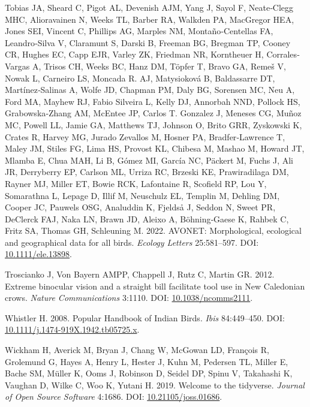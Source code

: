\documentclass[10pt,a4paper]{article}
\newlength{\cslhangindent}
\newenvironment{CSLReferences}[2] %
 {\begin{list}{}{%
  \setlength{\itemindent}{0pt}
  \setlength{\leftmargin}{0pt}
  \setlength{\parsep}{0pt}
  \ifodd #1
   \setlength{\leftmargin}{\cslhangindent}
   \setlength{\itemindent}{-1\cslhangindent}
  \fi
  \setlength{\itemsep}{#2\baselineskip}}}
 {\end{list}}
\begin{document}
\begin{CSLReferences}{1}{0}
Tobias JA, Sheard C, Pigot AL, Devenish AJM, Yang J, Sayol F, Neate‐Clegg MHC, Alioravainen N, Weeks TL, Barber RA, Walkden PA, MacGregor HEA, Jones SEI, Vincent C, Phillips AG, Marples NM, Montaño‐Centellas FA, Leandro‐Silva V, Claramunt S, Darski B, Freeman BG, Bregman TP, Cooney CR, Hughes EC, Capp EJR, Varley ZK, Friedman NR, Korntheuer H, Corrales‐Vargas A, Trisos CH, Weeks BC, Hanz DM, Töpfer T, Bravo GA, Remeš V, Nowak L, Carneiro LS, Moncada R. AJ, Matysioková B, Baldassarre DT, Martínez‐Salinas A, Wolfe JD, Chapman PM, Daly BG, Sorensen MC, Neu A, Ford MA, Mayhew RJ, Fabio Silveira L, Kelly DJ, Annorbah NND, Pollock HS, Grabowska‐Zhang AM, McEntee JP, Carlos T. Gonzalez J, Meneses CG, Muñoz MC, Powell LL, Jamie GA, Matthews TJ, Johnson O, Brito GRR, Zyskowski K, Crates R, Harvey MG, Jurado Zevallos M, Hosner PA, Bradfer‐Lawrence T, Maley JM, Stiles FG, Lima HS, Provost KL, Chibesa M, Mashao M, Howard JT, Mlamba E, Chua MAH, Li B, Gómez MI, García NC, Päckert M, Fuchs J, Ali JR, Derryberry EP, Carlson ML, Urriza RC, Brzeski KE, Prawiradilaga DM, Rayner MJ, Miller ET, Bowie RCK, Lafontaine R, Scofield RP, Lou Y, Somarathna L, Lepage D, Illif M, Neuschulz EL, Templin M, Dehling DM, Cooper JC, Pauwels OSG, Analuddin K, Fjeldså J, Seddon N, Sweet PR, DeClerck FAJ, Naka LN, Brawn JD, Aleixo A, Böhning‐Gaese K, Rahbek C, Fritz SA, Thomas GH, Schleuning M. 2022. {AVONET}: Morphological, ecological and geographical data for all birds. \emph{Ecology Letters} 25:581--597. DOI: \href{https://doi.org/10.1111/ele.13898}{10.1111/ele.13898}.

Troscianko J, Von Bayern AMPP, Chappell J, Rutz C, Martin GR. 2012. Extreme binocular vision and a straight bill facilitate tool use in {New} {Caledonian} crows. \emph{Nature Communications} 3:1110. DOI: \href{https://doi.org/10.1038/ncomms2111}{10.1038/ncomms2111}.

Whistler H. 2008. Popular {Handbook} of {Indian} {Birds}. \emph{Ibis} 84:449--450. DOI: \href{https://doi.org/10.1111/j.1474-919X.1942.tb05725.x}{10.1111/j.1474-919X.1942.tb05725.x}.

Wickham H, Averick M, Bryan J, Chang W, McGowan LD, François R, Grolemund G, Hayes A, Henry L, Hester J, Kuhn M, Pedersen TL, Miller E, Bache SM, Müller K, Ooms J, Robinson D, Seidel DP, Spinu V, Takahashi K, Vaughan D, Wilke C, Woo K, Yutani H. 2019. Welcome to the {tidyverse}. \emph{Journal of Open Source Software} 4:1686. DOI: \href{https://doi.org/10.21105/joss.01686}{10.21105/joss.01686}.


\end{CSLReferences}
\end{document}
